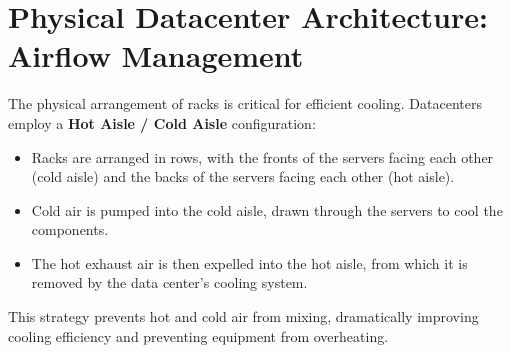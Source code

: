 \section{Physical Datacenter Architecture: Airflow Management}
The physical arrangement of racks is critical for efficient cooling. Datacenters employ a \textbf{Hot Aisle / Cold Aisle} configuration:
\begin{itemize}
    \item Racks are arranged in rows, with the fronts of the servers facing each other (cold aisle) and the backs of the servers facing each other (hot aisle).
    \item Cold air is pumped into the cold aisle, drawn through the servers to cool the components.
    \item The hot exhaust air is then expelled into the hot aisle, from which it is removed by the data center's cooling system.
\end{itemize}
This strategy prevents hot and cold air from mixing, dramatically improving cooling efficiency and preventing equipment from overheating.